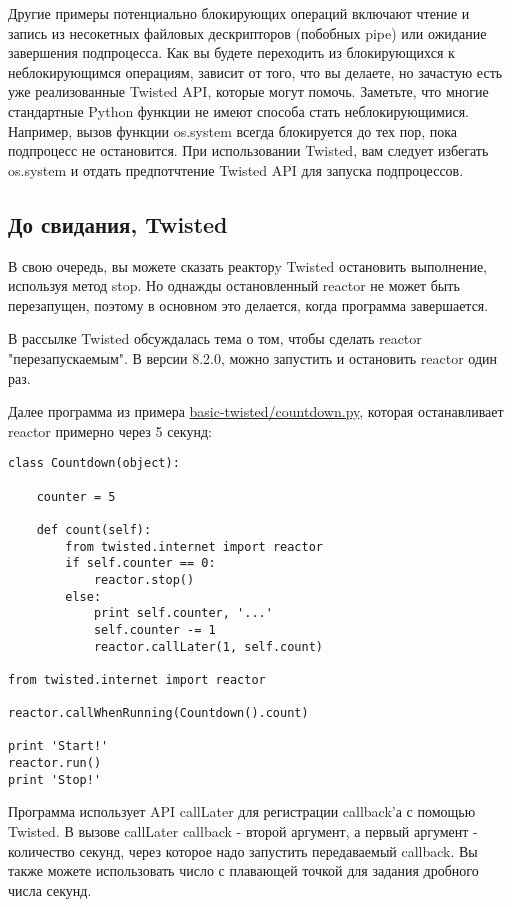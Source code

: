 Другие примеры потенциально блокирующих операций 
включают чтение и запись из несокетных файловых 
дескрипторов (побобных pipe) или ожидание завершения 
подпроцесса. Как вы будете переходить 
из блокирующихся к неблокирующимся операциям, зависит от того, 
что вы делаете, но зачастую есть уже реализованные Twisted API, 
которые могут помочь. Заметьте, что многие стандартные 
Python функции не имеют способа стать неблокирующимися. Например, 
вызов функции os.system всегда блокируется до тех пор, пока 
подпроцесс не остановится. При использовании Twisted, вам 
следует избегать os.system и отдать предпотчтение Twisted API 
для запуска подпроцессов.


\subsection{До свидания, Twisted}


В свою очередь, вы можете сказать реакторy Twisted 
остановить выполнение, используя метод stop. Но однажды 
остановленный reactor не может быть перезапущен, поэтому 
в основном это делается, когда программа завершается. 


В рассылке Twisted обсуждалась тема о том, чтобы сделать 
reactor "перезапускаемым". В версии 8.2.0, можно запустить и остановить 
reactor один раз.


Далее программа из примера 
\href{http://github.com/jdavisp3/twisted-intro/blob/master/basic-twisted/countdown.py}{basic-twisted/countdown.py}, 
которая останавливает reactor примерно через 5 секунд: 

 \begin{verbatim}
class Countdown(object):

    counter = 5

    def count(self):
        from twisted.internet import reactor
        if self.counter == 0:
            reactor.stop()
        else:
            print self.counter, '...'
            self.counter -= 1
            reactor.callLater(1, self.count)

from twisted.internet import reactor

reactor.callWhenRunning(Countdown().count)

print 'Start!'
reactor.run()
print 'Stop!'
\end{verbatim} 


Программа использует API callLater для регистрации callback'а с 
помощью Twisted. В вызове callLater callback - второй аргумент, 
а первый аргумент - количество секунд, через которое надо запустить 
передаваемый callback. Вы также можете использовать число с 
плавающей точкой для задания дробного числа секунд.


